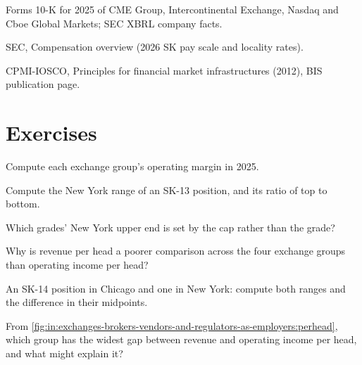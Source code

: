 \begin{omsources}
\item Forms 10-K for 2025 of CME Group, Intercontinental Exchange, Nasdaq and Cboe Global Markets; SEC XBRL company facts.
\item SEC, Compensation overview (2026 SK pay scale and locality rates).
\item CPMI-IOSCO, Principles for financial market infrastructures (2012), BIS publication page.
\end{omsources}

\section{Exercises}

\begin{exercise}[$\star$]\label{exo:in:exchanges-brokers-vendors-and-regulators-as-employers:1}
Compute each exchange group's operating margin in 2025.
\end{exercise}

\begin{exercise}[$\star$]\label{exo:in:exchanges-brokers-vendors-and-regulators-as-employers:2}
Compute the New York range of an SK-13 position, and its ratio of top to bottom.
\end{exercise}

\begin{exercise}[$\star$]\label{exo:in:exchanges-brokers-vendors-and-regulators-as-employers:3}
Which grades' New York upper end is set by the cap rather than the grade?
\end{exercise}

\begin{exercise}[$\star\star$]\label{exo:in:exchanges-brokers-vendors-and-regulators-as-employers:4}
Why is revenue per head a poorer comparison across the four exchange groups than operating income per head?
\end{exercise}

\begin{exercise}[$\star\star$]\label{exo:in:exchanges-brokers-vendors-and-regulators-as-employers:5}
An SK-14 position in Chicago and one in New York: compute both ranges and the difference in their midpoints.
\end{exercise}

\begin{exercise}[$\star\star$]\label{exo:in:exchanges-brokers-vendors-and-regulators-as-employers:6}
From \cref{fig:in:exchanges-brokers-vendors-and-regulators-as-employers:perhead}, which group has the widest gap
between revenue and operating income per head, and what might explain it?
\end{exercise}

